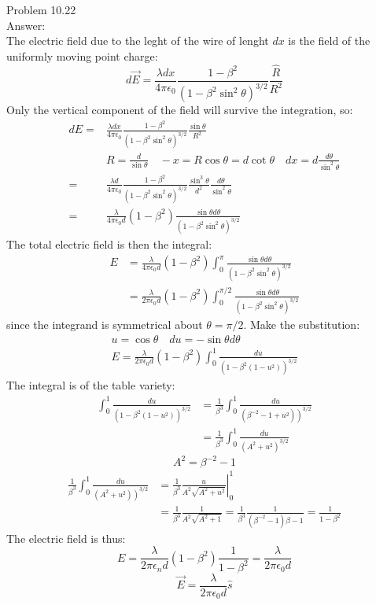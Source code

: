 \documentclass[UTF8]{ctexart}
\begin{document}
	Problem 10.22\\
	Answer:\\
	The electric field due to the leght of the wire of lenght $d x$ is the field of the uniformly moving point charge:
	$$d \vec{E}=\frac{\lambda d x}{4 \pi \epsilon_{0}} \frac{1-\beta^{2}}{\left(1-\beta^{2} \sin ^{2} \theta\right)^{3 / 2}} \frac{\hat{R}}{R^{2}}$$
	Only the vertical component of the field will survive the integration, so:
	$$\begin{aligned}
	d E=& \frac{\lambda d x}{4 \pi \epsilon_{0}} \frac{1-\beta^{2}}{\left(1-\beta^{2} \sin ^{2} \theta\right)^{3 / 2}} \frac{\sin \theta}{R^{2}} \\
	& R=\frac{d}{\sin \theta} \quad-x=R \cos \theta=d \cot \theta \quad d x=d \frac{d \theta}{\sin ^{2} \theta} \\
	=& \frac{\lambda d}{4 \pi \epsilon_{0}} \frac{1-\beta^{2}}{\left(1-\beta^{2} \sin ^{2} \theta\right)^{3 / 2}} \frac{\sin ^{3} \theta}{d^{2}} \frac{d \theta}{\sin ^{2} \theta} \\
	=& \frac{\lambda}{4 \pi \epsilon_{0} d}\left(1-\beta^{2}\right) \frac{\sin \theta d \theta}{\left(1-\beta^{2} \sin ^{2} \theta\right)^{3 / 2}}
	\end{aligned}$$
	The total electric field is then the integral:
	$$\begin{aligned}
	E &=\frac{\lambda}{4 \pi \epsilon_{0} d}\left(1-\beta^{2}\right) \int_{0}^{\pi} \frac{\sin \theta d \theta}{\left(1-\beta^{2} \sin ^{2} \theta\right)^{3 / 2}} \\
	&=\frac{\lambda}{2 \pi \epsilon_{0} d}\left(1-\beta^{2}\right) \int_{0}^{\pi / 2} \frac{\sin \theta d \theta}{\left(1-\beta^{2} \sin ^{2} \theta\right)^{3 / 2}}
	\end{aligned}$$
	since the integrand is symmetrical about $\theta=\pi / 2 .$ Make the substitution:
	$$\begin{array}{c}
	u=\cos \theta \quad d u=-\sin \theta d \theta \\
	E=\frac{\lambda}{2 \pi \epsilon_{0} d}\left(1-\beta^{2}\right) \int_{0}^{1} \frac{d u}{\left(1-\beta^{2}\left(1-u^{2}\right)\right)^{3 / 2}}
	\end{array}$$
	The integral is of the table variety:
	$$\begin{aligned}
	\int_{0}^{1} \frac{d u}{\left(1-\beta^{2}\left(1-u^{2}\right)\right)^{3 / 2}} &=\frac{1}{\beta^{3}} \int_{0}^{1} \frac{d u}{\left.\left(\beta^{-2}-1+u^{2}\right)\right)^{3 / 2}} \\
	&=\frac{1}{\beta^{3}} \int_{0}^{1} \frac{d u}{\left(A^{2}+u^{2}\right)^{3 / 2}}
	\end{aligned}$$
	$$A^{2}=\beta^{-2}-1$$
	$$\begin{aligned}
	\frac{1}{\beta^{3}} \int_{0}^{1} \frac{d u}{\left.\left(A^{2}+u^{2}\right)\right)^{3 / 2}} &=\left.\frac{1}{\beta^{3}} \frac{u}{A^{2} \sqrt{A^{2}+u^{2}}}\right|_{0} ^{1} \\
	&=\frac{1}{\beta^{3}} \frac{1}{A^{2} \sqrt{A^{2}+1}}=\frac{1}{\beta^{3}} \frac{1}{\left(\beta^{-2}-1\right) \beta-1}=\frac{1}{1-\beta^{2}}
	\end{aligned}$$
	The electric field is thus:
	$$E=\frac{\lambda}{2 \pi \epsilon_{n} d}\left(1-\beta^{2}\right) \frac{1}{1-\beta^{2}}=\frac{\lambda}{2 \pi \epsilon_{0} d}$$
	$$\vec{E}=\frac{\lambda}{2 \pi \epsilon_{0} d} \hat{s}$$
	
\end{document}
